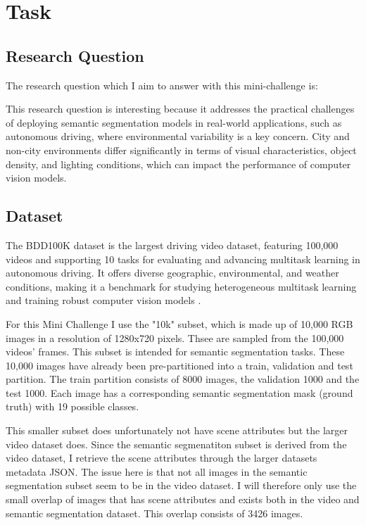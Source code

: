 \chapter{Task}

\section{Research Question}

The research question which I aim to answer with this mini-challenge is: 


This research question is interesting because it addresses the practical challenges of deploying semantic segmentation models in real-world applications, such as autonomous driving, where environmental variability is a key concern. City and non-city environments differ significantly in terms of visual characteristics, object density, and lighting conditions, which can impact the performance of computer vision models.

\section{Dataset}

The BDD100K dataset is the largest driving video dataset, featuring 100,000 videos and supporting 10 tasks for evaluating and advancing multitask learning in autonomous driving. It offers diverse geographic, environmental, and weather conditions, making it a benchmark for studying heterogeneous multitask learning and training robust computer vision models \cite{yuBDD100KDiverseDriving2020}. 

For this Mini Challenge I use the "10k" subset, which is made up of 10,000 RGB images in a resolution of 1280x720 pixels. Thsee are sampled from the 100,000 videos' frames. This subset is intended for semantic segmentation tasks. These 10,000 images have already been pre-partitioned into a train, validation and test partition. The train partition consists of 8000 images, the validation 1000 and the test 1000. Each image has a corresponding semantic segmentation mask (ground truth) with 19 possible classes.

This smaller subset does unfortunately not have scene attributes but the larger video dataset does. Since the semantic segmenatiton subset is derived from the video dataset, I retrieve the scene attributes through the larger datasets metadata JSON. The issue here is that not all images in the semantic segmentation subset seem to be in the video dataset. I will therefore only use the small overlap of images that has scene attributes and exists both in the video and semantic segmentation dataset. This overlap consists of 3426 images.

